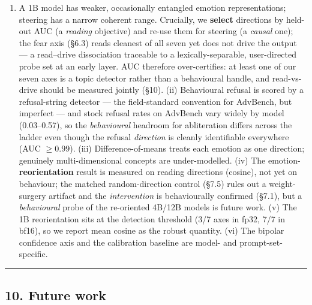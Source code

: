 \documentclass[
]{article}
\providecommand{\tightlist}{%
  \setlength{\itemsep}{0pt}\setlength{\parskip}{0pt}}
\begin{document}
\begin{enumerate}
\def\labelenumi{(\roman{enumi})}
\tightlist
\item
  A 1B model has weaker, occasionally entangled emotion representations;
  steering has a narrow coherent range. Crucially, we \textbf{select}
  directions by held-out AUC (a \emph{reading} objective) and re-use
  them for steering (a \emph{causal} one); the fear axis (§6.3) reads
  cleanest of all seven yet does not drive the output --- a read--drive
  dissociation traceable to a lexically-separable, user-directed probe
  set at an early layer. AUC therefore over-certifies: at least one of
  our seven axes is a topic detector rather than a behavioural handle,
  and read-vs-drive should be measured jointly (§10). (ii) Behavioural
  refusal is scored by a refusal-string detector --- the field-standard
  convention for AdvBench, but imperfect --- and stock refusal rates on
  AdvBench vary widely by model (0.03--0.57), so the \emph{behavioural}
  headroom for abliteration differs across the ladder even though the
  refusal \emph{direction} is cleanly identifiable everywhere (AUC
  \(\ge 0.99\)). (iii) Difference-of-means treats each emotion as one
  direction; genuinely multi-dimensional concepts are under-modelled.
  (iv) The emotion-\textbf{reorientation} result is measured on reading
  directions (cosine), not yet on behaviour; the matched
  random-direction control (§7.5) rules out a weight-surgery artifact
  and the \emph{intervention} is behaviourally confirmed (§7.1), but a
  \emph{behavioural} probe of the re-oriented 4B/12B models is future
  work. (v) The 1B reorientation sits at the detection threshold (3/7
  axes in fp32, 7/7 in bf16), so we report mean cosine as the robust
  quantity. (vi) The bipolar confidence axis and the calibration
  baseline are model- and prompt-set-specific.
\end{enumerate}

\begin{center}\rule{0.5\linewidth}{0.5pt}\end{center}

\subsection{10. Future work}\label{future-work}
\end{document}
